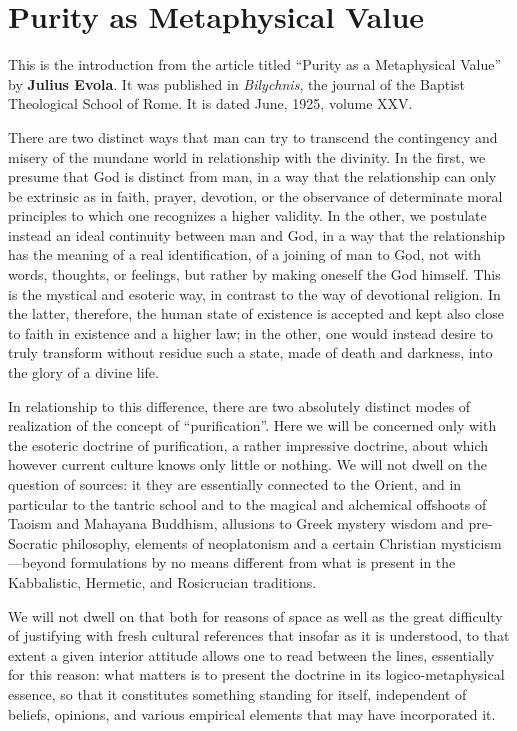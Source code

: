 \section{Purity as Metaphysical Value}

\begin{quotex}
This is the introduction from the article titled “Purity as a Metaphysical Value” by \textbf{Julius Evola}. It was published in \textit{Bilychnis}, the journal of the Baptist Theological School of Rome. It is dated June, 1925, volume XXV. 

\end{quotex} 

There are two distinct ways that man can try to transcend the contingency and misery of the mundane world in relationship with the divinity. In the first, we presume that God is distinct from man, in a way that the relationship can only be extrinsic as in faith, prayer, devotion, or the observance of determinate moral principles to which one recognizes a higher validity. In the other, we postulate instead an ideal continuity between man and God, in a way that the relationship has the meaning of a real identification, of a joining of man to God, not with words, thoughts, or feelings, but rather by making oneself the God himself. This is the mystical and esoteric way, in contrast to the way of devotional religion. In the latter, therefore, the human state of existence is accepted and kept also close to faith in existence and a higher law; in the other, one would instead desire to truly transform without residue such a state, made of death and darkness, into the glory of a divine life.

In relationship to this difference, there are two absolutely distinct modes of realization of the concept of “purification”. Here we will be concerned only with the esoteric doctrine of purification, a rather impressive doctrine, about which however current culture knows only little or nothing. We will not dwell on the question of sources: it they are essentially connected to the Orient, and in particular to the tantric school and to the magical and alchemical offshoots of Taoism and Mahayana Buddhism, allusions to Greek mystery wisdom and pre-Socratic philosophy, elements of neoplatonism and a certain Christian mysticism—beyond formulations by no means different from what is present in the Kabbalistic, Hermetic, and Rosicrucian traditions.

We will not dwell on that both for reasons of space as well as the great difficulty of justifying with fresh cultural references that insofar as it is understood, to that extent a given interior attitude allows one to read between the lines, essentially for this reason: what matters is to present the doctrine in its logico-metaphysical essence, so that it constitutes something standing for itself, independent of beliefs, opinions, and various empirical elements that may have incorporated it.

